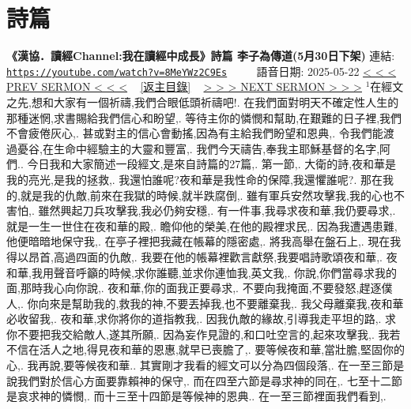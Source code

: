 \documentclass{book}
\begin{document}
\section{詩篇}
\label{sec:8MeYWz2C9Es}
\textbf{《漢協．讀經Channel:我在讀經中成長》詩篇 李子為傳道(5月30日下架)}
\newline
\newline
連結: \href{https://youtube.com/watch?v=8MeYWz2C9Es}{\texttt{https://youtube.com/watch?v=8MeYWz2C9Es}} ~~~~ 語音日期: 2025-05-22
\newline
\newline
\hyperref[sec:sKBiDMdPfrw]{\small{< < < PREV SERMON < < <}}
~
\hyperref[sec:index]{\small{[返主目錄]}}
~
\hyperref[sec:Rt9I2F6zVuw]{\small{> > > NEXT SERMON > > >}}
\newline
\newline
$^{1}$在經文之先,想和大家有一個祈禱,我們合眼低頭祈禱吧!.
在我們面對明天不確定性人生的那種迷惘,求書賜給我們信心和盼望,.
等待主你的憐憫和幫助,在艱難的日子裡,我們不會疲倦灰心,.
甚或對主的信心會動搖,因為有主給我們盼望和恩典,.
令我們能渡過憂谷,在生命中經驗主的大靈和豐富,.
我們今天禱告,奉我主耶穌基督的名字,阿們..
今日我和大家簡述一段經文,是來自詩篇的27篇,.
第一節,.
大衛的詩,夜和華是我的亮光,是我的拯救,.
我還怕誰呢?夜和華是我性命的保障,我還懼誰呢?.
那在我的,就是我的仇敵,前來在我獄的時候,就半跌腐倒,.
雖有軍兵安然攻擊我,我的心也不害怕,.
雖然興起刀兵攻擊我,我必仍夠安穩,.
有一件事,我尋求夜和華,我仍要尋求,.
就是一生一世住在夜和華的殿,.
瞻仰他的榮美,在他的殿裡求民,.
因為我遭遇患難,他便暗暗地保守我,.
在亭子裡把我藏在帳幕的隱密處,.
將我高舉在盤石上,.
現在我得以昂首,高過四面的仇敵,.
我要在他的帳幕裡歡言獻祭,我要唱詩歌頌夜和華,.
夜和華,我用聲音呼籲的時候,求你誰聽,並求你連恤我,英文我,.
你說,你們當尋求我的面,那時我心向你說,.
夜和華,你的面我正要尋求,.
不要向我掩面,不要發怒,趕逐僕人,.
你向來是幫助我的,救我的神,不要丟掉我,也不要離棄我,.
我父母離棄我,夜和華必收留我,.
夜和華,求你將你的道指教我,.
因我仇敵的緣故,引導我走平坦的路,.
求你不要把我交給敵人,遂其所願,.
因為妄作見證的,和口吐空言的,起來攻擊我,.
我若不信在活人之地,得見夜和華的恩惠,就早已喪膽了,.
要等候夜和華,當壯膽,堅固你的心,.
我再說,要等候夜和華..
其實剛才我看的經文可以分為四個段落,.
在一至三節是說我們對於信心方面要靠賴神的保守,.
而在四至六節是尋求神的同在,.
七至十二節是哀求神的憐憫,.
而十三至十四節是等候神的恩典..
在一至三節裡面我們看到,.
\end{document}
